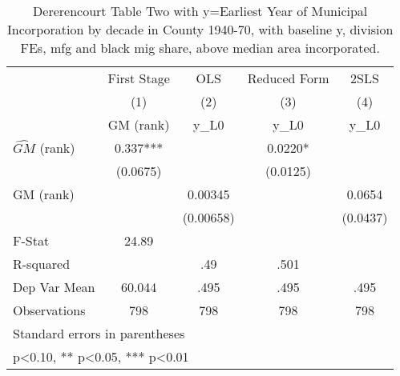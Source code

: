 \begin{table}[htbp]\centering
\def\sym#1{\ifmmode^{#1}\else\(^{#1}\)\fi}
\caption{Dererencourt Table Two with y=Earliest Year of Municipal Incorporation by decade in County 1940-70, with baseline y, division FEs, mfg and black mig share, above median area incorporated.}
\begin{tabular}{l*{4}{c}}
\toprule
                    & First Stage   &         OLS   &Reduced Form   &        2SLS   \\
                    &\multicolumn{1}{c}{(1)}&\multicolumn{1}{c}{(2)}&\multicolumn{1}{c}{(3)}&\multicolumn{1}{c}{(4)}\\
                    &\multicolumn{1}{c}{GM  (rank)}&\multicolumn{1}{c}{y\_L0}&\multicolumn{1}{c}{y\_L0}&\multicolumn{1}{c}{y\_L0}\\
\midrule
$\hat{GM}$ (rank)   &       0.337***&               &      0.0220*  &               \\
                    &    (0.0675)   &               &    (0.0125)   &               \\
\addlinespace
GM  (rank)          &               &     0.00345   &               &      0.0654   \\
                    &               &   (0.00658)   &               &    (0.0437)   \\
\midrule
F-Stat              &       24.89   &               &               &               \\
R-squared           &               &         .49   &        .501   &               \\
Dep Var Mean        &      60.044   &        .495   &        .495   &        .495   \\
Observations        &         798   &         798   &         798   &         798   \\
\bottomrule
\multicolumn{5}{l}{\footnotesize Standard errors in parentheses}\\
\multicolumn{5}{l}{\footnotesize * p<0.10, ** p<0.05, *** p<0.01}\\
\end{tabular}
\end{table}
